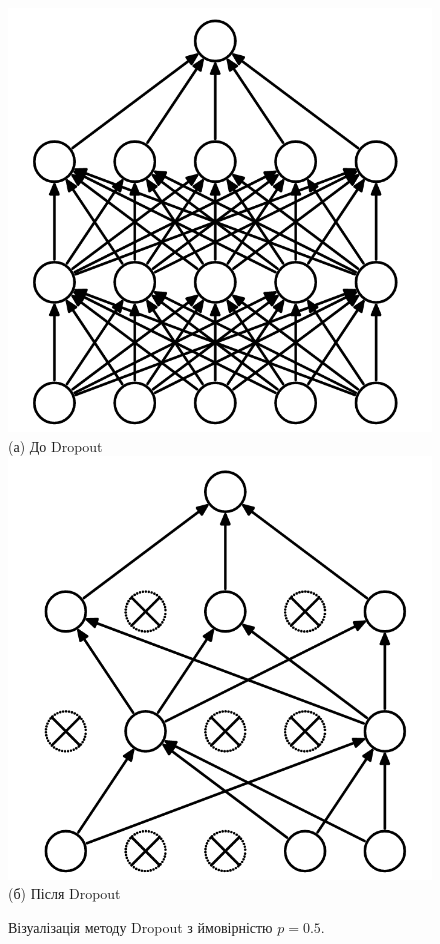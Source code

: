 \begin{figure}[t]
	\centering
	\centering	
	\includegraphics[width=0.8\linewidth]{Figures/Chapter4/dropout1.png}
	\\ (а) До Dropout
	\endminipage\hfill
	\centering	
	\includegraphics[width=0.8\linewidth]{Figures/Chapter4/dropout2.png}
	\\ (б) Після Dropout
	\endminipage\hfill
	\endminipage\hfill
	
	\caption{Візуалізація методу Dropout з ймовірністю \(p = 0.5\).}
	\label{fig:dropout}
\end{figure}

